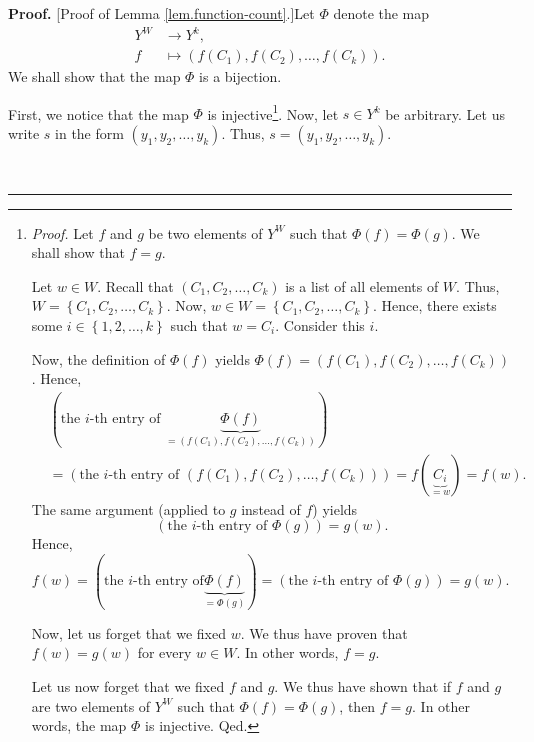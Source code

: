 \documentclass[numbers=enddot,12pt,final,onecolumn,notitlepage]{scrartcl}%
\theoremstyle{definition}
\newenvironment{proof}[1][Proof]{\noindent\textbf{#1.} }{\ \rule{0.5em}{0.5em}}
\newenvironment{verlong}{}{}
\begin{document}
\begin{verlong}
\begin{proof}
[Proof of Lemma \ref{lem.function-count}.]Let $\Phi$ denote the map%
\begin{align*}
Y^{W}  &  \rightarrow Y^{k},\\
f  &  \mapsto\left(  f\left(  C_{1}\right)  ,f\left(  C_{2}\right)
,\ldots,f\left(  C_{k}\right)  \right)  .
\end{align*}
We shall show that the map $\Phi$ is a bijection.

First, we notice that the map $\Phi$ is injective\footnote{\textit{Proof.} Let
$f$ and $g$ be two elements of $Y^{W}$ such that $\Phi\left(  f\right)
=\Phi\left(  g\right)  $. We shall show that $f=g$.
\par
Let $w\in W$. Recall that $\left(  C_{1},C_{2},\ldots,C_{k}\right)  $ is a
list of all elements of $W$. Thus, $W=\left\{  C_{1},C_{2},\ldots
,C_{k}\right\}  $. Now, $w\in W=\left\{  C_{1},C_{2},\ldots,C_{k}\right\}  $.
Hence, there exists some $i\in\left\{  1,2,\ldots,k\right\}  $ such that
$w=C_{i}$. Consider this $i$.
\par
Now, the definition of $\Phi\left(  f\right)  $ yields $\Phi\left(  f\right)
=\left(  f\left(  C_{1}\right)  ,f\left(  C_{2}\right)  ,\ldots,f\left(
C_{k}\right)  \right)  $. Hence,%
\begin{align*}
&  \left(  \text{the }i\text{-th entry of }\underbrace{\Phi\left(  f\right)
}_{=\left(  f\left(  C_{1}\right)  ,f\left(  C_{2}\right)  ,\ldots,f\left(
C_{k}\right)  \right)  }\right) \\
&  =\left(  \text{the }i\text{-th entry of }\left(  f\left(  C_{1}\right)
,f\left(  C_{2}\right)  ,\ldots,f\left(  C_{k}\right)  \right)  \right)
=f\left(  \underbrace{C_{i}}_{=w}\right)  =f\left(  w\right)  .
\end{align*}
The same argument (applied to $g$ instead of $f$) yields%
\[
\left(  \text{the }i\text{-th entry of }\Phi\left(  g\right)  \right)
=g\left(  w\right)  .
\]
Hence, $f\left(  w\right)  =\left(  \text{the }i\text{-th entry of
}\underbrace{\Phi\left(  f\right)  }_{=\Phi\left(  g\right)  }\right)
=\left(  \text{the }i\text{-th entry of }\Phi\left(  g\right)  \right)
=g\left(  w\right)  $.
\par
Now, let us forget that we fixed $w$. We thus have proven that $f\left(
w\right)  =g\left(  w\right)  $ for every $w\in W$. In other words, $f=g$.
\par
Let us now forget that we fixed $f$ and $g$. We thus have shown that if $f$
and $g$ are two elements of $Y^{W}$ such that $\Phi\left(  f\right)
=\Phi\left(  g\right)  $, then $f=g$. In other words, the map $\Phi$ is
injective. Qed.}. Now, let $s\in Y^{k}$ be arbitrary. Let us write $s$ in the
form $\left(  y_{1},y_{2},\ldots,y_{k}\right)  $. Thus, $s=\left(  y_{1}%
,y_{2},\ldots,y_{k}\right)  $.


\end{proof}
\end{verlong}
\end{document}
